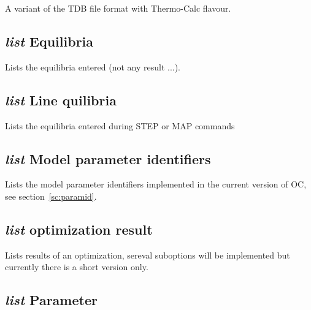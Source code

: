 \documentclass[12pt]{article}
\begin{document}
A variant of the TDB file format with Thermo-Calc flavour.

\subsection{{\em list} Equilibria}

Lists the equilibria entered (not any result ...).

\subsection{{\em list} Line quilibria}

Lists the equilibria entered during STEP or MAP commands

\subsection{{\em list} Model parameter identifiers}

Lists the model parameter identifiers implemented in the current
version of OC, see section~\ref{sc:paramid}.

\subsection{{\em list} optimization result}

Lists results of an optimization, sereval suboptions will be
implemented but currently there is a short version only.

\subsection{{\em list} Parameter}
\end{document}
